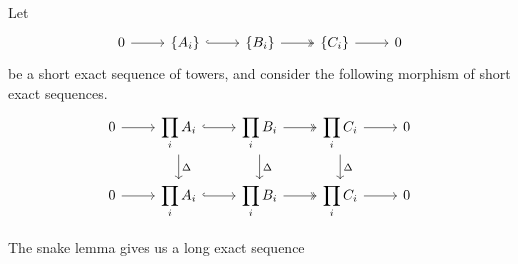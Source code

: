 \documentclass[main.tex]{subfiles}
\begin{document}
Let
\begin{equation*}
  \begin{tikzcd}
    0
    \arrow[r]
    & \{A_{i}\}
    \arrow[r, hook]
    & \{B_{i}\}
    \arrow[r, two heads]
    & \{C_{i}\}
    \arrow[r]
    & 0
  \end{tikzcd}
\end{equation*}
be a short exact sequence of towers, and consider the following morphism of short exact sequences.
\begin{equation*}
  \begin{tikzcd}
    0
    \arrow[r]
    & \displaystyle\prod\limits_{i} A_{i}
    \arrow[r, hook]
    \arrow[d, "\Delta"]
    & \displaystyle\prod\limits_{i} B_{i}
    \arrow[r, two heads]
    \arrow[d, "\Delta"]
    & \displaystyle\prod\limits_{i} C_{i}
    \arrow[r]
    \arrow[d, "\Delta"]
    & 0
    \\
    0
    \arrow[r]
    & \displaystyle\prod\limits_{i} A_{i}
    \arrow[r, hook]
    & \displaystyle\prod\limits_{i} B_{i}
    \arrow[r, two heads]
    & \displaystyle\prod\limits_{i} C_{i}
    \arrow[r]
    & 0
  \end{tikzcd}
\end{equation*}

The snake lemma gives us a long exact sequence
\end{document}
